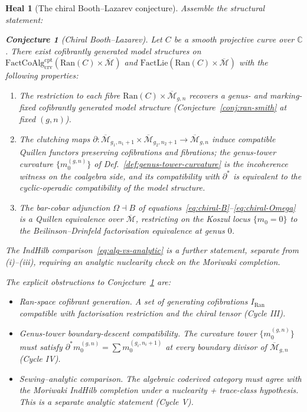 \documentclass[11pt]{amsart}
\newtheorem*{heal}{Heal}
\newtheorem{conjecture}[theorem]{Conjecture}
\newcommand{\cM}{\mathcal{M}}
\newcommand{\Ran}{\mathrm{Ran}}
\newcommand{\FactCoAlg}{\mathrm{FactCoAlg}}
\newcommand{\FactLie}{\mathrm{FactLie}}
\newcommand{\crv}{\mathrm{crv}}
\newcommand{\cpt}{\mathrm{cpt}}
\newcommand{\Mbar}{\overline{\cM}}
\begin{document}
\begin{heal}[The chiral Booth--Lazarev conjecture]
Assemble the structural statement:
\begin{conjecture}[Chiral Booth--Lazarev]
\label{conj:chiral-BL}
Let $C$ be a smooth projective curve over $\mathbb{C}$. There exist
cofibrantly generated model structures on
$\FactCoAlg^{\cpt}_{\crv}(\Ran(C)\times\Mbar)$ and
$\FactLie(\Ran(C)\times\Mbar)$ with the following properties:
\begin{enumerate}[label=(\roman*)]
\item The restriction to each fibre
$\Ran(C)\times\Mbar_{g,n}$ recovers a genus- and marking-fixed
cofibrantly generated model structure (Conjecture~\ref{conj:ran-smith}
at fixed $(g,n)$).
\item The clutching maps
$\partial:\Mbar_{g_1,n_1+1}\times\Mbar_{g_2,n_2+1}\to\Mbar_{g,n}$
induce compatible Quillen functors preserving cofibrations and
fibrations; the genus-tower curvature
$\{m_0^{(g,n)}\}$ of Def.~\ref{def:genus-tower-curvature} is the
incoherence witness on the coalgebra side, and its compatibility
with $\partial^*$ is equivalent to the cyclic-operadic
compatibility of the model structure.
\item The bar-cobar adjunction $\Omega\dashv B$ of
equations~\eqref{eq:chiral-B}--\eqref{eq:chiral-Omega} is a
Quillen equivalence over $\Mbar$, restricting on the Koszul locus
$\{m_0=0\}$ to the Beilinson--Drinfeld factorisation
equivalence at genus $0$.
\end{enumerate}
The IndHilb comparison~\eqref{eq:alg-vs-analytic} is a \emph{further}
statement, separate from (i)--(iii), requiring an analytic nuclearity
check on the Moriwaki completion.
\end{conjecture}

The explicit obstructions to Conjecture~\ref{conj:chiral-BL} are:
\begin{itemize}
\item[(O1)] \emph{Ran-space cofibrant generation.} A set of
generating cofibrations $I_{\Ran}$ compatible with factorisation
restriction and the chiral tensor (Cycle III).
\item[(O2)] \emph{Genus-tower boundary-descent compatibility.}
The curvature tower $\{m_0^{(g,n)}\}$ must satisfy
$\partial^* m_0^{(g,n)}=\sum m_0^{(g_i,n_i+1)}$ at every boundary
divisor of $\Mbar_{g,n}$ (Cycle IV).
\item[(O3)] \emph{Sewing--analytic comparison.} The algebraic coderived
category must agree with the Moriwaki IndHilb completion under a
nuclearity + trace-class hypothesis. This is a separate analytic
statement (Cycle V).
\end{itemize}
\end{heal}
\end{document}
